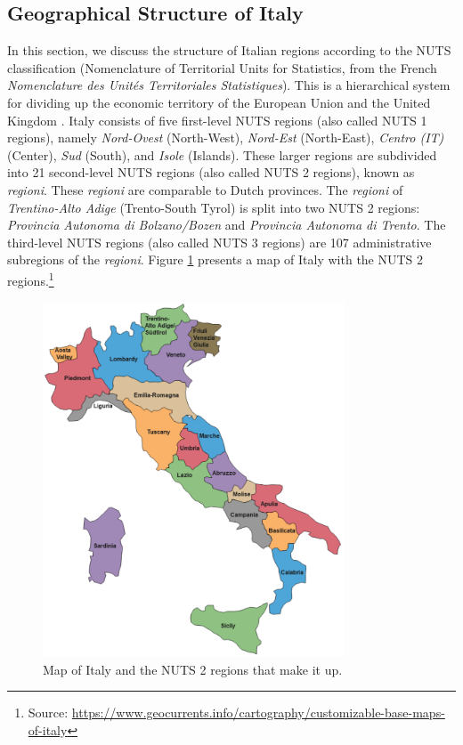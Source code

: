 \documentclass[12pt]{article}
\begin{document}
	\subsection{Geographical Structure of Italy} \label{subsec:italy_geography}
	In this section, we discuss the structure of Italian regions according to the NUTS classification (Nomenclature of Territorial Units for Statistics, from the French \textit{Nomenclature des Unités Territoriales Statistiques}). This is a hierarchical system for dividing up the economic territory of the European Union and the United Kingdom \parencite{background-nuts}. Italy consists of five first-level NUTS regions (also called NUTS 1 regions), namely \textit{Nord-Ovest} (North-West), \textit{Nord-Est} (North-East), \textit{Centro (IT)} (Center), \textit{Sud} (South), and \textit{Isole} (Islands). These larger regions are subdivided into 21 second-level NUTS regions (also called NUTS 2 regions), known as \textit{regioni}. These \textit{regioni} are comparable to Dutch provinces. The \textit{regioni} of \textit{Trentino-Alto Adige} (Trento-South Tyrol) is split into two NUTS 2 regions: \textit{Provincia Autonoma di Bolzano/Bozen} and \textit{Provincia Autonoma di Trento}. The third-level NUTS regions (also called NUTS 3 regions) are 107 administrative subregions of the \textit{regioni}. Figure \ref{fig:map_italy} presents a map of Italy with the NUTS 2 regions.\footnote{Source: \url{https://www.geocurrents.info/cartography/customizable-base-maps-of-italy}}
	
	\begin{figure}[H]
	    \centering
	    \includegraphics[width=0.8\textwidth]{output/Italy-Map.pdf}
	    \caption{Map of Italy and the NUTS 2 regions that make it up.}
	    \label{fig:map_italy}
	\end{figure}
	
\end{document}
